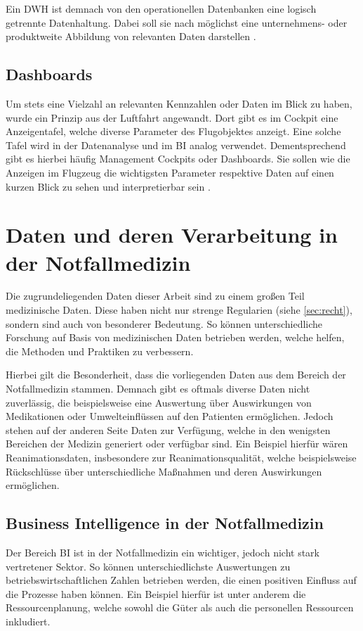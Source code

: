 Ein \gls{DWH} ist demnach von den operationellen Datenbanken eine logisch getrennte Datenhaltung.
Dabei soll sie nach \cite[S.6]{Mucksch.2000} möglichst eine unternehmens- oder produktweite Abbildung von relevanten Daten darstellen \cite{Kemper.2004}.

\cite[S.7]{Gabriel.2011}


\subsection{Dashboards}
Um stets eine Vielzahl an relevanten Kennzahlen oder Daten im Blick zu haben, wurde ein Prinzip aus der Luftfahrt angewandt.
Dort gibt es im Cockpit eine Anzeigentafel, welche diverse Parameter des Flugobjektes anzeigt.
Eine solche Tafel wird in der Datenanalyse und im \gls{BI} analog verwendet.
Dementsprechend gibt es hierbei häufig \glqq Management Cockpits\grqq{} oder \glqq Dashboards\grqq.
Sie sollen wie die Anzeigen im Flugzeug die wichtigsten Parameter respektive Daten auf einen kurzen Blick zu sehen und interpretierbar sein \cite[S.18]{Engels.2015}.


\section{Daten und deren Verarbeitung in der Notfallmedizin} %
Die zugrundeliegenden Daten dieser Arbeit sind zu einem großen Teil medizinische Daten.
Diese haben nicht nur strenge Regularien (siehe \ref{sec:recht}), sondern sind auch von besonderer Bedeutung.
So können unterschiedliche Forschung auf Basis von medizinischen Daten betrieben werden, welche helfen, die Methoden und Praktiken zu verbessern.

Hierbei gilt die Besonderheit, dass die vorliegenden Daten aus dem Bereich der Notfallmedizin stammen.
Demnach gibt es oftmals diverse Daten nicht zuverlässig, die beispielsweise eine Auswertung über Auswirkungen von Medikationen oder Umwelteinflüssen auf den Patienten ermöglichen.
Jedoch stehen auf der anderen Seite Daten zur Verfügung, welche in den wenigsten Bereichen der Medizin generiert oder verfügbar sind.
Ein Beispiel hierfür wären Reanimationsdaten, insbesondere zur Reanimationsqualität, welche beispielsweise Rückschlüsse über unterschiedliche Maßnahmen und deren Auswirkungen ermöglichen.

\subsection{Business Intelligence in der Notfallmedizin}
Der Bereich \gls{BI} ist in der Notfallmedizin ein wichtiger, jedoch nicht stark vertretener Sektor.
So können unterschiedlichste Auswertungen zu betriebswirtschaftlichen Zahlen betrieben werden, die einen positiven Einfluss auf die Prozesse haben können.
Ein Beispiel hierfür ist unter anderem die Ressourcenplanung, welche sowohl die Güter als auch die personellen Ressourcen inkludiert.

